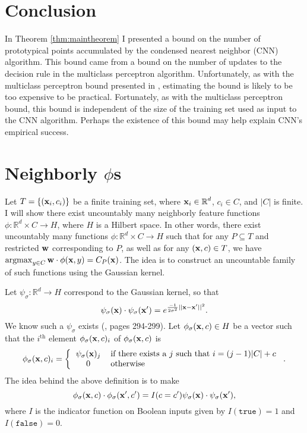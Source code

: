 \documentclass{article}
\newcommand{\R}{ \mbox{${\mathbb R}$}}
\newcommand{\argmax}{\operatornamewithlimits{argmax}}
\begin{document}
\section{Conclusion}
In Theorem \ref{thm:maintheorem} I presented a bound on the number of prototypical points accumulated by the condensed nearest neighbor (CNN) algorithm. This bound came from a bound on the number of updates to the decision rule in the multiclass perceptron algorithm. Unfortunately, as with the multiclass perceptron bound presented in \cite{CollinsPerceptron}, estimating the bound is likely to be too expensive to be practical. Fortunately, as with the multiclass perceptron bound, this bound is independent of the size of the training set used as input to the CNN algorithm. Perhaps the existence of this bound may help explain CNN's empirical success.

\appendix

\section{Neighborly $\phi$s}
\label{sec:appdx}
Let $T = \{ ({\bf x}_i,c_i) \}$ be a finite training set, where ${\bf x}_i \in \R^d$, $c_i \in C$, and $|C|$ is finite. I will show there exist uncountably many neighborly feature functions $\phi : \R^d \times C \rightarrow H$, where $H$ is a Hilbert space. In other words, there exist uncountably many functions $\phi : \R^d \times C \rightarrow H$ such that for any $P \subseteq T$ and restricted ${\bf w}$ corresponding to $P$, as well as for any $({\bf x},c) \in T$, we have $\argmax_{y \in C} {\bf w} \cdot \phi({\bf x},y) = C_P({\bf x})$. The idea is to construct an uncountable family of such functions using the Gaussian kernel.

Let $\psi_\sigma:\R^d \rightarrow H$ correspond to the Gaussian kernel, so that 
\[
\psi_\sigma({\bf x}) \cdot \psi_\sigma({\bf x}') = e^{\frac{-1}{2 \sigma^2} ||{\bf x} - {\bf x}'||^2}.
\] 
We know such a $\psi_\sigma$ exists (\cite{bishop-2006}, pages 294-299). Let $\phi_\sigma({\bf x},c) \in H$ be a vector such that the $i^{\text{th}}$ element $\phi_\sigma({\bf x},c)_i$ of $\phi_\sigma({\bf x},c)$ is
\[
\phi_\sigma({\bf x},c)_i = 
\left\{ \begin{tabular}{ c l}
  $\psi_\sigma({\bf x})_j$ & if there exists a $j$ such that $i = (j-1)|C| + c$  \\
  $0$ & otherwise  \\
\end{tabular}\right..
\]
The idea behind the above definition is to make
\[
\phi_\sigma({\bf x},c)  \cdot \phi_\sigma({\bf x}',c') = I(c = c') \psi_\sigma({\bf x}) \cdot \psi_\sigma({\bf x}'),
\]
where $I$ is the indicator function on Boolean inputs given by $I(\texttt{true})=1$ and $I({\texttt{false}}) = 0$.
\end{document}
